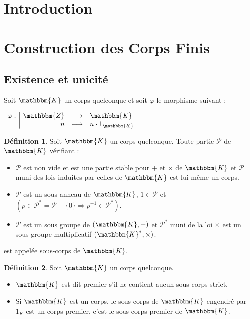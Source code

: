 \documentclass[12pt]{article}
\newcommand{\Z}{\mathbbm{Z}}
\newcommand{\K}{\mathbbm{K}}
\theoremstyle{definition}
\newtheorem{definition}{Définition}
\begin{document}
\tableofcontents
\pagebreak

\section*{Introduction}
\vfill \eject
\section{Construction des Corps Finis}
\subsection{Existence et unicité}
\vspace{12pt}
Soit $\K$ un corps quelconque et soit $\varphi$ le morphisme suivant :
\begin{center}
$
\begin{array}{l|rcl}
\varphi : & \Z & \longrightarrow & \K \\
    & n & \longmapsto & n\cdot 1_{\K}
\end{array}
$
\end{center}
\vspace{12pt}
\begin{definition}
Soit $\K$ un corps quelconque. Toute partie $\mathcal{P}$ de $\K$ vérifiant :
\begin{itemize}
\item $\mathcal{P}$ est non vide et est une partie stable pour $+$ et $\times$ de $\K$ et $\mathcal{P}$ muni des lois induites par celles de $\K$ est lui-même un corps.
\item $\mathcal{P}$ est un sous anneau de $\K$, $1 \in \mathcal{P}$ et $(p \in \mathcal{P}^{*} = \mathcal{P} - \{0 \} \Rightarrow p^{-1} \in \mathcal{P}^{*})$.
\item $\mathcal{P}$ est un sous groupe de $(\K, +)$ et $\mathcal{P}^{*}$ muni de la loi $\times$ est un sous groupe multiplicatif $(\K^{*}, \times)$.
\end{itemize}
est appelée sous-corps de $\K$.
\end{definition}
\vspace{12pt}
\begin{definition}
Soit $\K$ un corps quelconque.
\begin{itemize}
\item $\K$ est dit premier s'il ne contient aucun sous-corps strict.
\item Si $\K$ est un corps, le sous-corps de $\K$ engendré par $1_{K}$ est un corps premier, c'est le sous-corps premier de $\K$.
\end{itemize}
\end{definition}
\end{document}
